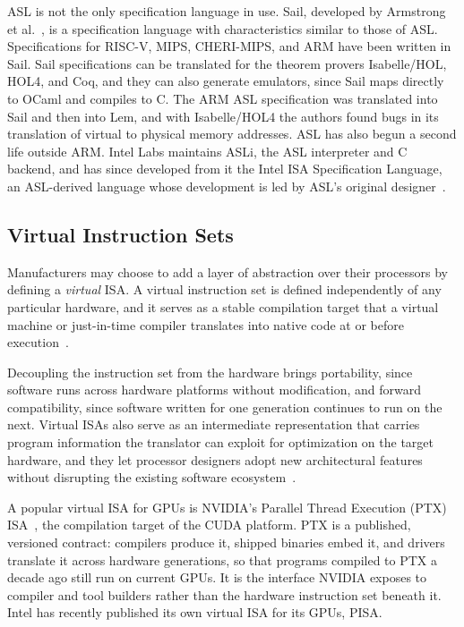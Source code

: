 ASL is not the only specification language in use. Sail, developed by
Armstrong et al.~\cite{isa-semantics}, is a specification language with
characteristics similar to those of ASL. Specifications for RISC-V, MIPS,
CHERI-MIPS, and ARM have been written in Sail. Sail specifications can be
translated for the theorem provers Isabelle/HOL, HOL4, and Coq, and they can
also generate emulators, since Sail maps directly to OCaml and compiles to
C. The ARM ASL specification was translated into Sail and then into Lem, and
with Isabelle/HOL4 the authors found bugs in its translation of virtual to
physical memory addresses. ASL has also begun a second life outside ARM. Intel Labs maintains ASLi, the
ASL interpreter and C backend, and has since developed from it the Intel ISA
Specification Language, an ASL-derived language whose development is led by ASL's
original designer~\cite{intel-isa-tools}.

\subsection{Virtual Instruction Sets}
\label{sec:virtual-isa}

Manufacturers may choose to add a layer of abstraction over their processors
by defining a \emph{virtual} ISA. A virtual instruction set is defined independently of
any particular hardware, and it serves as a stable compilation target that a
virtual machine or just-in-time compiler translates into native code at or
before execution~\cite{adve-llva}.

Decoupling the instruction set from the hardware brings portability, since
software runs across hardware platforms without modification, and forward
compatibility, since software written for one generation continues to run on
the next. Virtual ISAs also serve as an intermediate representation that
carries program information the translator can exploit for optimization on
the target hardware, and they let processor designers adopt new architectural
features without disrupting the existing software
ecosystem~\cite{adve-llva}.

A popular virtual ISA for GPUs is NVIDIA's Parallel Thread Execution
(PTX) ISA~\cite{ptx-isa}, the compilation target of the CUDA platform. PTX is a
published, versioned contract: compilers produce it, shipped binaries embed
it, and drivers translate it across hardware generations, so that programs
compiled to PTX a decade ago still run on current GPUs. It is the interface
NVIDIA exposes to compiler and tool builders rather than the hardware
instruction set beneath it. Intel has recently
published its own virtual ISA for its GPUs, PISA.

